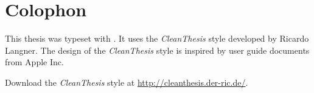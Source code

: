 %
\pagestyle{empty}
\hfill
\vfill
{}
\section*{Colophon}

This thesis was typeset with \LaTeXe.
It uses the \textit{CleanThesis} style developed by Ricardo Langner.
The design of the \textit{CleanThesis} style is inspired by user guide documents from Apple Inc.

Download the \textit{CleanThesis} style at \url{http://cleanthesis.der-ric.de/}.
